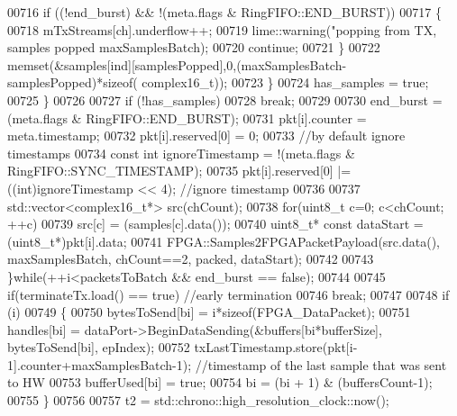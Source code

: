 \begin{DoxyCode}
00716                     \textcolor{keywordflow}{if} ((!end\_burst) && !(meta.flags & RingFIFO::END_BURST))
00717                     \{
00718                         mTxStreams[ch].underflow++;
00719                         lime::warning(\textcolor{stringliteral}{"popping from TX, samples popped %
      maxSamplesBatch);
00720                         \textcolor{keywordflow}{continue};
00721                     \}
00722                     memset(&samples[ind][samplesPopped],0,(maxSamplesBatch-samplesPopped)*\textcolor{keyword}{sizeof}(
      complex16_t));
00723                 \}
00724                 has\_samples = \textcolor{keyword}{true};
00725             \}
00726 
00727             \textcolor{keywordflow}{if} (!has\_samples)
00728                 \textcolor{keywordflow}{break};
00729 
00730             end\_burst = (meta.flags & RingFIFO::END_BURST);
00731             pkt[i].counter = meta.timestamp;
00732             pkt[i].reserved[0] = 0;
00733             \textcolor{comment}{//by default ignore timestamps}
00734             \textcolor{keyword}{const} \textcolor{keywordtype}{int} ignoreTimestamp = !(meta.flags & RingFIFO::SYNC_TIMESTAMP);
00735             pkt[i].reserved[0] |= ((int)ignoreTimestamp << 4); \textcolor{comment}{//ignore timestamp}
00736 
00737             std::vector<complex16\_t*> src(chCount);
00738             \textcolor{keywordflow}{for}(uint8\_t c=0; c<chCount; ++c)
00739                 src[c] = (samples[c].data());
00740             uint8\_t* \textcolor{keyword}{const} dataStart = (uint8\_t*)pkt[i].data;
00741             FPGA::Samples2FPGAPacketPayload(src.data(), maxSamplesBatch, chCount==2, packed, dataStart);
00742 
00743         \}\textcolor{keywordflow}{while}(++i<packetsToBatch && end\_burst == \textcolor{keyword}{false});
00744 
00745         \textcolor{keywordflow}{if}(terminateTx.load() == \textcolor{keyword}{true}) \textcolor{comment}{//early termination}
00746             \textcolor{keywordflow}{break};
00747 
00748         \textcolor{keywordflow}{if} (i)
00749         \{
00750             bytesToSend[bi] = i*\textcolor{keyword}{sizeof}(FPGA_DataPacket);
00751             handles[bi] = dataPort->BeginDataSending(&buffers[bi*bufferSize], bytesToSend[bi], epIndex);
00752             txLastTimestamp.store(pkt[i-1].counter+maxSamplesBatch-1); \textcolor{comment}{//timestamp of the last sample that
       was sent to HW}
00753             bufferUsed[bi] = \textcolor{keyword}{true};
00754             bi = (bi + 1) & (buffersCount-1);
00755         \}
00756 
00757         t2 = std::chrono::high\_resolution\_clock::now();
}
\end{DoxyCode}
